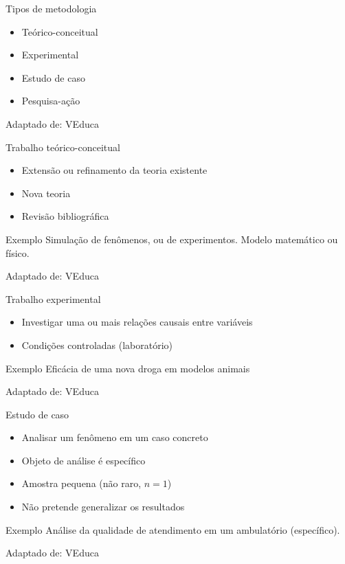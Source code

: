 \documentclass{beamer}
\begin{document}
\begin{frame}{Tipos de metodologia}
  \begin{itemize}
    \footnotesize
  \item<1-> Teórico-conceitual
  \bigskip
  \item<1-> Experimental
  \bigskip
  \item<1-> Estudo de caso
  \bigskip
  \item<1-> Pesquisa-ação
  \end{itemize}

  \vfill
  \scriptsize
  Adaptado de: VEduca
\end{frame}

\begin{frame}{Trabalho teórico-conceitual}
  \begin{itemize}
    \footnotesize
  \item Extensão ou refinamento da teoria existente
  \item Nova teoria
  \item Revisão bibliográfica
  \end{itemize}
  \begin{exampleblock}{Exemplo}
    \scriptsize
    Simulação de fenômenos, ou de experimentos. Modelo matemático ou físico.
  \end{exampleblock}

  \vfill
  \scriptsize
  Adaptado de: VEduca
\end{frame}

\begin{frame}{Trabalho experimental}
  \begin{itemize}
    \footnotesize
  \item Investigar uma ou mais relações causais entre variáveis
  \item Condições controladas (laboratório)
  \end{itemize}
  \begin{exampleblock}{Exemplo}
    \scriptsize
    Eficácia de uma nova droga em modelos animais
  \end{exampleblock}

  \vfill
  \scriptsize
  Adaptado de: VEduca
\end{frame}

\begin{frame}{Estudo de caso}
  \begin{itemize}
    \footnotesize
  \item Analisar um fenômeno em um caso concreto
  \item Objeto de análise é específico
  \item Amostra pequena (não raro, $n=1$)
  \item Não pretende generalizar os resultados
  \end{itemize}
  \begin{exampleblock}{Exemplo}
    \scriptsize
    Análise da qualidade de atendimento em um ambulatório (específico).
  \end{exampleblock}

  \vfill
  \scriptsize
  Adaptado de: VEduca
\end{frame}
\end{document}

